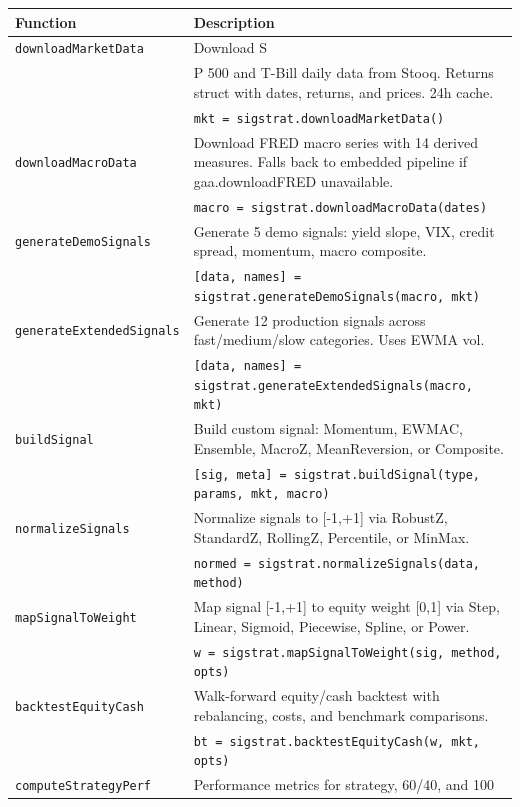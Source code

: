 \documentclass[11pt,a4paper]{article}
\begin{document}
\begin{longtable}{p{3.8cm} p{11.2cm}}
\toprule
\textbf{Function} & \textbf{Description} \\
\midrule
\endhead
\texttt{downloadMarketData} & Download S\\&P 500 and T-Bill daily data from Stooq. Returns struct with dates, returns, and prices. 24h cache. \\
& {\small\texttt{mkt = sigstrat.downloadMarketData()}} \\
\midrule
\texttt{downloadMacroData} & Download FRED macro series with 14 derived measures. Falls back to embedded pipeline if gaa.downloadFRED unavailable. \\
& {\small\texttt{macro = sigstrat.downloadMacroData(dates)}} \\
\midrule
\texttt{generateDemoSignals} & Generate 5 demo signals: yield slope, VIX, credit spread, momentum, macro composite. \\
& {\small\texttt{[data, names] = sigstrat.generateDemoSignals(macro, mkt)}} \\
\midrule
\texttt{generateExtendedSignals} & Generate 12 production signals across fast/medium/slow categories. Uses EWMA vol. \\
& {\small\texttt{[data, names] = sigstrat.generateExtendedSignals(macro, mkt)}} \\
\midrule
\texttt{buildSignal} & Build custom signal: Momentum, EWMAC, Ensemble, MacroZ, MeanReversion, or Composite. \\
& {\small\texttt{[sig, meta] = sigstrat.buildSignal(type, params, mkt, macro)}} \\
\midrule
\texttt{normalizeSignals} & Normalize signals to [-1,+1] via RobustZ, StandardZ, RollingZ, Percentile, or MinMax. \\
& {\small\texttt{normed = sigstrat.normalizeSignals(data, method)}} \\
\midrule
\texttt{mapSignalToWeight} & Map signal [-1,+1] to equity weight [0,1] via Step, Linear, Sigmoid, Piecewise, Spline, or Power. \\
& {\small\texttt{w = sigstrat.mapSignalToWeight(sig, method, opts)}} \\
\midrule
\texttt{backtestEquityCash} & Walk-forward equity/cash backtest with rebalancing, costs, and benchmark comparisons. \\
& {\small\texttt{bt = sigstrat.backtestEquityCash(w, mkt, opts)}} \\
\midrule
\texttt{computeStrategyPerf} & Performance metrics for strategy, 60/40, and 100\\%

\end{longtable}
\end{document}

